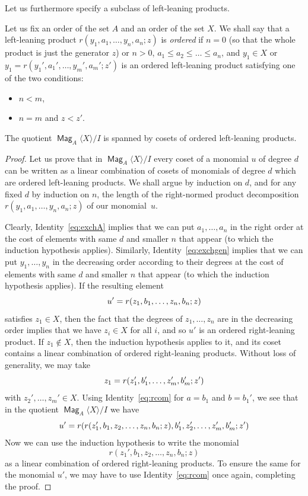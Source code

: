 \documentclass[AHL,Unicode,longabstracts]{cedram}
\DeclareMathOperator{\Mag}{\mathsf{Mag}}
\let\originalleft\left
\let\originalright\right
\renewcommand{\left}{\mathopen{}\mathclose\bgroup\originalleft}
\renewcommand{\right}{\aftergroup\egroup\originalright}
\begin{document}
Let us furthermore specify a subclass of left-leaning products.

\begin{defi}\label{ordered}
Let us fix an order of the set $A$ and an order of the set $X$. We shall say that a left-leaning product $r(y_1,a_1,\dots,y_n,a_n;z)$ is \emph{ordered} if $n=0$ (so that the whole product is just the generator $z$) or $n>0$, $a_1\le a_2\le\dots\le a_n$, and\pagebreak{} $y_1\in X$ or $y_1=r(y_1',a_1',\dots,y_m',a_m';z')$ is an ordered left-leaning product satisfying one of the two conditions:
\begin{itemize}
\item $n<m$,
\item $n=m$ and $z<z'$.
\end{itemize}
\end{defi}

\begin{prop}\label{prop:ordright}
The quotient $\Mag_A\langle X\rangle/I$ is spanned by cosets of ordered left-leaning products.
\end{prop}

\begin{proof}
Let us prove that in $\Mag_A\langle X\rangle/I$ every coset of a monomial $u$ of degree $d$ can be written as a linear combination of cosets of monomials of degree $d$ which are ordered left-leaning products. We shall argue by induction on $d$, and for any fixed $d$ by induction on $n$, the length of the right-normed product decomposition $r(y_1,a_1,\dots,y_n,a_n;z)$ of our monomial~$u$.

Clearly, Identity~\eqref{eq:exchA} implies that we can put $a_1,\dots,a_n$ in the right order at the cost of elements with same $d$ and smaller $n$ that appear (to which the induction hypothesis applies). Similarly, Identity~\eqref{eq:exchgen} implies that we can put $y_1,\dots,y_{n}$ in the decreasing order according to their degrees at the cost of elements with same $d$ and smaller $n$ that appear (to which the induction hypothesis applies). If the resulting element
\[
u'=r\left(z_1,b_1,\dots,z_n,b_n;z\right)
\]
satisfies $z_1\in X$, then the fact that the degrees of $z_1,\dots,z_{n}$ are in the decreasing order implies that we have $z_i\in X$ for all $i$, and so $u'$ is an ordered right-leaning product. If $z_1\notin X$, then the induction hypothesis applies to it, and its coset contains a linear combination of ordered right-leaning products. Without loss of generality, we may take
\[
z_1=r\left(z_1',b_1',\dots,z_m',b_m';z'\right)
\]
with $z_2',\dots,z_m'\in X$. Using Identity~\eqref{eq:rcom} for $a=b_1$ and $b=b_1'$, we see that in the quotient $\Mag_A\langle X\rangle/I$ we have
\[
u'=r\left(r\left(z_1',b_1,z_2,\dots,z_n,b_n;z\right),b_1',z_2',\dots,z_m',b_m';z'\right)
\]
Now we can use the induction hypothesis to write the monomial
\[
r(z_1',b_1,z_2,\dots,z_n,b_n;z)
\]
as a linear combination of ordered right-leaning products. To ensure the same for the monomial $u'$, we may have to use Identity~\eqref{eq:rcom} once again, completing the proof.
\end{proof}
\end{document}
